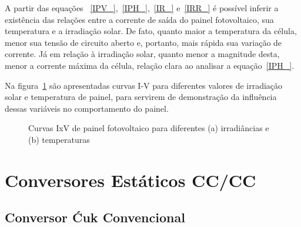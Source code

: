 \documentclass[
	12pt,				%
	openright,			%
	twoside,			%
	a4paper,			%
	english,			%
	french,				%
	spanish,			%
	brazil,				%
	]{abntex2}
\begin{document}
A partir das equações ~\ref{IPV_},~\ref{IPH_},~\ref{IR_} e~\ref{IRR_} é possível inferir a existência das relações entre a corrente de saída do painel fotovoltaico, sua temperatura e a irradiação solar. De fato, quanto maior a temperatura da célula, menor sua tensão de circuito aberto e, portanto, mais rápida sua variação de corrente. Já em relação à irradiação solar, quanto menor a magnitude desta, menor a corrente máxima da célula, relação clara ao analisar a equação~\ref{IPH_}.

Na figura~\ref{fig:iv_pv_} são apresentadas curvas I-V para diferentes valores de irradiação solar e temperatura de painel, para servirem de demonstração da influência dessas variáveis no comportamento do painel.

\begin{figure}[htbp]%
	\captionsetup{justification=centering}
	\centering
	\qquad
	\caption{Curvas IxV de painel fotovoltaico para diferentes (a) irradiâncias e (b) temperaturas}%
	\label{fig:iv_pv_}%
\end{figure}


\section{Conversores Estáticos CC/CC}

\subsection{Conversor Ćuk Convencional}
\end{document}
